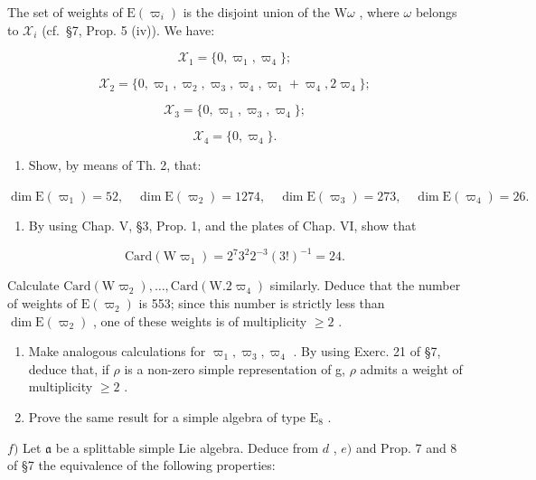 The set of weights of \(\mathrm{E}(\varpi_i)\) is the disjoint union of the \(\mathrm{W}\omega\) , where \(\omega\) belongs to \(\mathcal{X}_i\) (cf.~§7, Prop. 5 (iv)). We have:

\[
\mathcal {X} _ {1} = \{0, \varpi_ {1}, \varpi_ {4} \};
\]

\[
\mathcal {X} _ {2} = \{0, \varpi_ {1}, \varpi_ {2}, \varpi_ {3}, \varpi_ {4}, \varpi_ {1} + \varpi_ {4}, 2 \varpi_ {4} \};
\]

\[
\mathcal {X} _ {3} = \{0, \varpi_ {1}, \varpi_ {3}, \varpi_ {4} \};
\]

\[
\mathcal {X} _ {4} = \{0, \varpi_ {4} \}.
\]

\begin{enumerate}
\def\labelenumi{\alph{enumi})}
\setcounter{enumi}{1}
\tightlist
\item
  Show, by means of Th. 2, that:
\end{enumerate}

\(\dim \mathrm{E}(\varpi_1) = 52,\quad \dim \mathrm{E}(\varpi_2) = 1274,\quad \dim \mathrm{E}(\varpi_3) = 273,\quad \dim \mathrm{E}(\varpi_4) = 26.\)

\begin{enumerate}
\def\labelenumi{\alph{enumi})}
\setcounter{enumi}{2}
\tightlist
\item
  By using Chap. V, §3, Prop. 1, and the plates of Chap. VI, show that
\end{enumerate}

\[
\mathrm{Card} (\mathrm{W} \varpi_ {1}) = 2 ^ {7} 3 ^ {2} 2 ^ {- 3} (3!) ^ {- 1} = 24.
\]

Calculate \(\mathrm{Card}(\mathrm{W}\varpi_{2}),\ldots,\mathrm{Card}(\mathrm{W}.2\varpi_{4})\) similarly. Deduce that the number of weights of \(\mathrm{E}(\varpi_{2})\) is 553; since this number is strictly less than \(\dim\mathrm{E}(\varpi_{2})\) , one of these weights is of multiplicity \(\geq2\) .

\begin{enumerate}
\def\labelenumi{\alph{enumi})}
\setcounter{enumi}{3}
\item
  Make analogous calculations for \(\varpi_{1},\varpi_{3},\varpi_{4}\) . By using Exerc. 21 of §7, deduce that, if \(\rho\) is a non-zero simple representation of g, \(\rho\) admits a weight of multiplicity \(\geq2\) .
\item
  Prove the same result for a simple algebra of type \(\mathrm{E}_8\) .
\end{enumerate}

\(f)\) Let \(\mathfrak{a}\) be a splittable simple Lie algebra. Deduce from \(d\) , \(e)\) and Prop. 7 and 8 of §7 the equivalence of the following properties:

